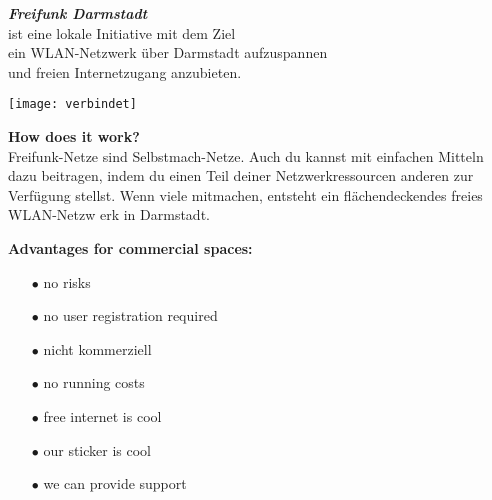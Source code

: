 \documentclass[a4paper]{article}
\begin{document}
\thispagestyle{empty}
 
\begin{center}
\Huge \textit{\textbf{\textcolor{freifunkpink}{Freifunk Darmstadt}}} \\
\vspace{0.6cm}
\large ist eine lokale Initiative mit dem Ziel \\
\large ein WLAN-Netzwerk über Darmstadt aufzuspannen \\
\large und freien Internetzugang anzubieten.
\normalsize

\vspace{1.5cm}

\hspace*{-0.05 \paperwidth}\texttt{[image: verbindet]}
\end{center}

\vspace{0.7cm}

\begin{Row}
    \begin{Cell}{1}
    \textbf{How does it work?} \\
Freifunk-Netze sind Selbstmach-Netze. Auch du kannst mit einfachen Mitteln dazu
 beitragen, indem du einen Teil deiner Netzwerkressourcen anderen zur Verfügung
 stellst. Wenn viele mitmachen, entsteht ein flächendeckendes freies WLAN-Netzw
erk in Darmstadt.
    \end{Cell}
    \begin{Cell}{1}    
    \textbf{Advantages for commercial spaces:} \vspace*{-0.18cm}
	\begin{itemize}
	   \item[\textcolor{freifunkpink}{\Large$\bullet$}] no risks \vspace*{-0.3cm}
	   \item[\textcolor{freifunkpink}{\Large$\bullet$}] no user registration required \vspace*{-0.3cm}
	   \item[\textcolor{freifunkpink}{\Large$\bullet$}] nicht kommerziell \vspace*{-0.3cm}
	   \item[\textcolor{freifunkpink}{\Large$\bullet$}] no running costs \vspace*{-0.3cm}
	   \item[\textcolor{freifunkpink}{\Large$\bullet$}] free internet is cool\vspace*{-0.3cm}
	   \item[\textcolor{freifunkpink}{\Large$\bullet$}] our sticker is cool\vspace*{-0.3cm}
	   \item[\textcolor{freifunkpink}{\Large$\bullet$}] we can provide support
	\end{itemize}
    \end{Cell}
\end{Row}
\newpage
\end{document}
